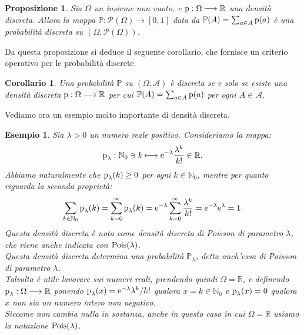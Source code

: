 \documentclass[11pt]{book}
\theoremstyle{Definizione}
\theoremstyle{TeoremaProposizioneLemmaCorollario}
\newtheorem{mycor}[myteo]{Corollario}
\newtheorem{mypropo}[myteo]{Proposizione}
\theoremstyle{OsservazioneNota}
\newtheorem{myes}{Esempio}[section]
\newcommand{\R}{\mathbb{R}}
\newcommand{\N}{\mathbb{N}}
\newcommand{\parti}[1]{\mathcal{P}\left({#1}\right)}
\renewcommand{\P}{\mathbb{P}}
\newcommand{\Pois}{\textup{Pois}}
\newcommand{\p}{\textup{p}}
\newcommand{\e}{\textup{e}}
\begin{document}
\begin{boxpro}
\begin{mypropo}
Sia $\Omega$ un insieme non vuoto, e $\p:\Omega \longrightarrow \R$ una densità discreta. Allora la mappa $\P:\parti{\Omega}\longrightarrow [0,1]$ data da $\P(A) = \sum_{a\in A} \p(a)$ è una probabilità discreta su $(\Omega,\parti{\Omega})$.
\end{mypropo}
\end{boxpro}
\noindent
Da questa proposizione si deduce il seguente corollario, che fornisce un criterio operativo per le probabilità discrete.
\begin{boxoss}
\begin{mycor}
Una probabilità $\P$ su $(\Omega,\mathcal{A})$ è discreta se e solo se esiste una densità discreta $\p:\Omega \longrightarrow \R$ per cui $\P(A) = \sum_{a\in A} \p(a)$ per ogni $A\in \mathcal{A}$.
\end{mycor}
\end{boxoss}
\noindent
Vediamo ora un esempio molto importante di densità discreta.
\begin{myes}
Sia $\lambda > 0$ un numero reale positivo. Consideriamo la mappa:
$$
\p_\lambda: \N_0 \ni k \longmapsto \e^{-\lambda} \frac{\lambda^k}{k!}\in \R.
$$
Abbiamo naturalmente che $\p_\lambda(k) \geq 0$ per ogni $k\in \N_0$, mentre per quanto riguarda la seconda proprietà:
$$
\sum_{k\in \N_0} \p_\lambda(k) = \sum_{k = 0}^\infty \p_\lambda(k) = \e^{-\lambda}\sum_{k = 0}^\infty \frac{\lambda^k}{k!} = \e^{-\lambda}\e^{\lambda} = 1.
$$
Questa densità discreta è nota come densità discreta di Poisson di parametro $\lambda$, che viene anche indicata con $\Pois(\lambda)$.\\
Questa densità discreta determina una probabilità $\P_\lambda$, detta anch'essa di Poisson di parametro $\lambda$.\\
Talvolta è utile lavorare sui numeri reali, prendendo quindi $\Omega = \R$, e definendo $\p_\lambda:\Omega \longrightarrow \R$ ponendo $\p_\lambda(x) = \e^{-\lambda}\lambda^k/k!$ qualora $x = k\in \N_0$ e $\p_\lambda(x) = 0$ qualora $x$ non sia un numero intero non negativo.\\
Siccome non cambia nulla in sostanza, anche in questo caso in cui $\Omega = \R$ usiamo la notazione $\Pois(\lambda)$.
\end{myes}
\end{document}
